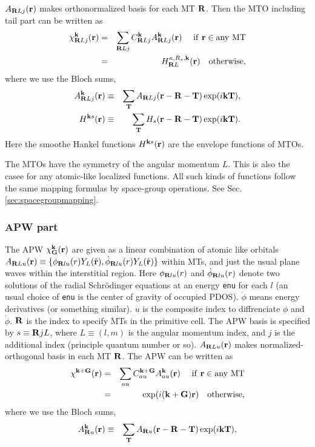 \documentclass[a4paper,10pt,fleqn]{article}
\newcommand{\bfT}{{\bf T}}
\newcommand{\bfG}{{\bf G}}
\newcommand{\bfR}{{\bf R}}
\begin{document}
$A_{\bfR{Lj}}({\bf r})$ makes orthonormalized basis for each MT $\bfR$.
Then the MTO including tail part can be written as
\begin{eqnarray}
\label{coeff1}
\chi^{{\bf k}}_{\bfR{Lj}}({\bf r}) &=& \sum_{\bfR{Lj}} C^{{\bf k}}_{\bfR{Lj}} A^{\bf k}_{\bfR{Lj}}({\bf r})   \ \ \ {\rm \ if \ {\bf r} \in any \ MT} \nonumber \\
        &=&   H^{\kappa,R_s,{\bf k}}_{\bfR{L}}({\bf r}) \ \ \ {\rm otherwise},
\end{eqnarray}
where we use the Bloch sums,
\begin{eqnarray}
A^{\bf k}_{\bfR{Lj}}({\bf r}) &\equiv& \sum_{\bf T} A_{\bfR{Lj}}({\bf r-\bfR-\bfT}) \exp(i {\bf kT}), \\
H^{{\bf k}s}({\bf r})   &\equiv& \sum_{\bf T} H_{s}({\bf r-\bfR-\bfT})
 \exp(i {\bf kT}).
\label{eq:blochmto}
\end{eqnarray}
Here the smoothe Hankel functions $H^{{\bf k}s}({\bf r})$ are 
the envelope functions of MTOs.

The MTOs have the symmetry of the angular momentum $L$.
This is also the casee for any atomic-like localized functions.
All such kinds of functions follow the same mapping formulas by space-group operations.
See Sec.\ref{sec:spacegroupmapping}.

\subsubsection{ APW part}
The APW $\chi^{{\bf k}}_\bfG({\bf r})$ are 
given as a linear combination of atomic like orbitals
\noindent $A_{\bfR{Lu}}({\bf r})\equiv 
\{ \phi_{\bfR{l}u}(r) Y_L(\hat{\bf r}),
    \dot{\phi}_{\bfR{l}u}(r) Y_L(\hat{\bf r}) \}$
within MTs, and just the usual plane waves 
within the interstitial region. Here
$\phi_{\bfR{l}u}(r)$ and $\dot{\phi}_{\bfR{l}u}(r)$ 
denote two solutions of
the radial Schr\"odinger equations at an energy \verb#enu# 
for each $l$ (an usual choice of \verb#enu# is the center of 
gravity of occupied PDOS). $\dot{\phi}$ means energy derivatives
(or something similar).
$u$ is the composite index
to diffrenciate $\phi$ and $\dot{\phi}$.
$\bfR$ is the index to specify MTs in the primitive cell.
The APW basis is specified by $s \equiv {\bfR{j}L}$, where
$L\equiv(l,m)$ is the angular momentum index, 
and $j$ is the additional index (principle quantum number or so). 
$A_{\bfR{L}u}({\bf r})$ makes normalized-orthogonal basis in
each MT $\bfR$.
The APW can be written as
\begin{eqnarray}
\label{coeff2}
\chi^{\bf k+G}({\bf r}) &=& \sum_{a u} C^{\bf k+G}_{a u} A^{\bf k}_{a u}({\bf r})   \ \ \ {\rm \ if \ {\bf r} \in any \ MT} \nonumber \\
        &=&   \exp(i ({\bf k+G}){\bf r}) \ \ \ {\rm otherwise},
\end{eqnarray}
where we use the Bloch sums,
\begin{eqnarray}
A^{\bf k}_{\bfR u}({\bf r}) &\equiv& \sum_{\bf T} 
A_{\bfR u}({\bf r-R-T}) \exp(i {\bf kT}),
\end{eqnarray}
\end{document}
